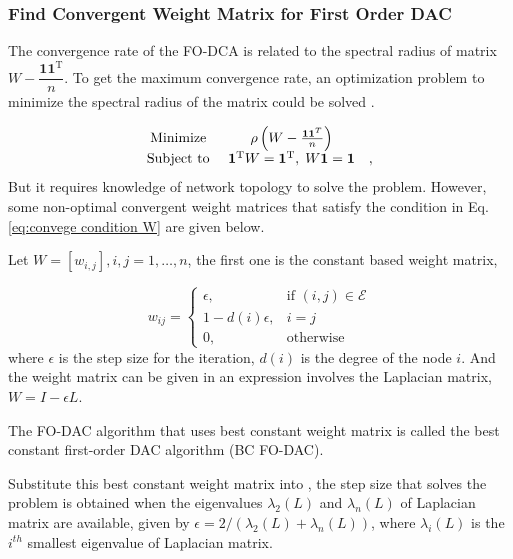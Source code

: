 \subsubsection{Find Convergent Weight Matrix for First Order DAC}

The convergence rate of the FO-DCA is related to the spectral radius
of matrix $W-\dfrac{\mathbf{11}^{\mathrm{T}}}{n}$. To get
the maximum convergence rate, an optimization problem to minimize
the spectral radius of the matrix could be solved \cite{Xiao2004}. 

\begin{equation}
\begin{array}{ccc}
\mbox{\mbox{Minimize }} & \rho\left(W-\frac{\mathbf{1}\mathbf{1}^{T}}{n}\right)\\
\mbox{Subject to } & \mathbf{1}^{\mathrm{T}}W=\mathbf{1}^{\mathrm{T}},\;W\mathbf{1}=\mathbf{1} & ,
\end{array}\label{eq: Opt. FO-DAC Problem}
\end{equation}
But it requires knowledge of network topology to solve the problem.
However, some non-optimal convergent weight matrices that satisfy
the condition in Eq.\eqref{eq:convege condition W} are given below. 

Let $W=\left[w_{i,j}\right],i,j=1,\ldots,n$, the first one
is the constant based weight matrix,

\begin{equation}
w_{ij}=\begin{cases}
\epsilon, & \mbox{if }(i,j)\in\mathit{\mathcal{E}}\\
1-d(i)\epsilon, & i=j\\
0, & \mbox{otherwise}
\end{cases}\label{eq:Best Const. Mtx}
\end{equation}
where $\epsilon$ is the step size for the iteration, $d(i)$ is the
degree of the node $i$. And the weight matrix can be given in an
expression involves the Laplacian matrix, $W=I-\epsilon L$. 

The FO-DAC algorithm that uses best constant weight matrix 
is called the best constant first-order DAC algorithm (BC FO-DAC). 

Substitute this best constant weight matrix into ,
the step size that solves the problem is obtained when the eigenvalues
$\lambda_{2}\left(L\right)$ and $\lambda_{n}\left(L\right)$ of Laplacian
matrix are available, given by $\epsilon=2/\left(\lambda_{2}\left(L\right)+\lambda_{n}\left(L\right)\right)$,
where $\lambda_{i}\left(L\right)$ is the $i^{th}$ smallest eigenvalue
of Laplacian matrix. 

